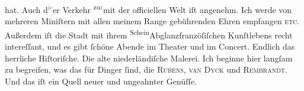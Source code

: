                hat. Auch d\substVorne{}\textsuperscript{\textcolor{gray}{ie}}\substDazwischen{}er\substHinten{} Verkehr \substVorne{}\textsuperscript{zu\textcolor{gray}{r}}\substDazwischen{}mit der\substHinten{} officiellen Welt iſt angenehm. Ich werde von mehreren Miniſtern mit allen
               meinem Range gebührenden Ehren empfangen \textsc{etc.} Außerdem iſt
               die Stadt mit ihrem \substVorne{}\textsuperscript{Schein}\substDazwischen{}Abglanz\substHinten{}{ }franzöſiſchen Kunſtlebens recht
               intereſſant, und es gibt ſchöne Abende im Theater und im Concert. Endlich das
               herrliche Hiſtoriſche. Die alte niederländiſche Malerei. Ich beginne hier langſam zu begreifen, was das für
               Dinger ſind, die \textsc{Rubens}, \textsc{van Dyck} und \textsc{Rembrandt}. Und das iſt ein Quell neuer und {\pb}ungeahnter
               Genüſſe.\pend
           

